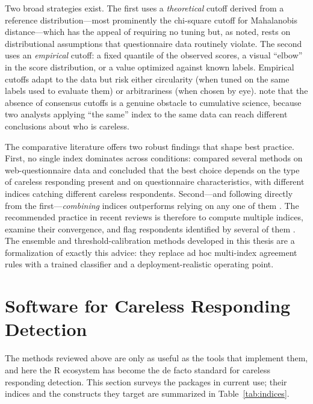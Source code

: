 \documentclass[doc,11pt,donotrepeattitle]{apa7}
\begin{document}
Two broad strategies exist. The first uses a \emph{theoretical} cutoff derived
from a reference distribution---most prominently the chi-square cutoff for
Mahalanobis distance---which has the appeal of requiring no tuning but, as
noted, rests on distributional assumptions that questionnaire data routinely
violate. The second uses an \emph{empirical} cutoff: a fixed quantile of the
observed scores, a visual ``elbow'' in the score distribution, or a value
optimized against known labels. Empirical cutoffs adapt to the data but risk
either circularity (when tuned on the same labels used to evaluate them) or
arbitrariness (when chosen by eye). \textcite{ward2023dealing} note that the
absence of consensus cutoffs is a genuine obstacle to cumulative science,
because two analysts applying ``the same'' index to the same data can reach
different conclusions about who is careless.

The comparative literature offers two robust findings that shape best practice.
First, no single index dominates across conditions:
\textcite{niessen2016detecting} compared several methods on web-questionnaire
data and concluded that the best choice depends on the type of careless
responding present and on questionnaire characteristics, with different indices
catching different careless respondents. Second---and following directly from
the first---\emph{combining} indices outperforms relying on any one of them
\parencite{curran2016methods, schroeders2022detecting}. The recommended
practice in recent reviews is therefore to compute multiple indices, examine
their convergence, and flag respondents identified by several of them
\parencite{ward2023dealing, desimone2015best}. The ensemble and threshold-calibration
methods developed in this thesis are a formalization of exactly this advice: they
replace ad hoc multi-index agreement rules with a trained classifier and a
deployment-realistic operating point.

\section{Software for Careless Responding Detection}

The methods reviewed above are only as useful as the tools that implement them,
and here the \textsf{R} ecosystem has become the de facto standard for careless
responding detection. This section surveys the packages in current use; their
indices and the constructs they target are summarized in
Table~\ref{tab:indices}.
\end{document}
